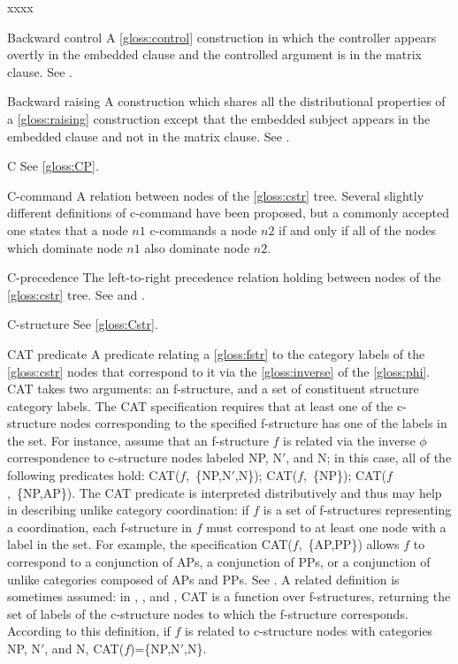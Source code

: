 \documentclass[output=paper,colorlinks,citecolor=brown]{langscibook}
\begin{document}
\begin{labeling}{xxxx}
\item[Backward control\namedlabel{gloss:backward}{backward}] A \ref{gloss:control} construction in which the controller appears overtly in the embedded clause and the controlled argument is in the matrix clause.  See .

\item[Backward raising] A construction which shares all the distributional properties of a \ref{gloss:raising} construction except that the embedded subject appears in the embedded clause and not in the matrix clause. See .

\item[C] See \ref{gloss:CP}.

\item[C-command\namedlabel{gloss:ccommand}{c-command}] A relation between nodes of the \ref{gloss:cstr} tree.  Several slightly different definitions of c-command have been proposed, but a commonly accepted one states that a node $n1$ c-commands a node $n2$ if and only if all of the nodes which dominate node $n1$ also dominate node $n2$.

\item[C-precedence\namedlabel{gloss:cprec}{c-precedence}] The left-to-right precedence relation holding between nodes of the \ref{gloss:cstr} tree.  See \citetv[\ref{sect:fprec}]{chapters/CoreConcepts} and \citetv[\ref{sec:Anaphora:2.3}]{chapters/Anaphora}.

\item[C-structure] See \ref{gloss:Cstr}.

\item[CAT predicate] A predicate relating a \ref{gloss:fstr} to the category labels of the \ref{gloss:cstr} nodes that correspond to it via the \ref{gloss:inverse} of the \ref{gloss:phi}.  CAT takes two arguments: an f-structure, and a set of constituent structure category labels. The CAT specification requires that at least one of the c-structure nodes corresponding to the specified f-structure has one of the labels in the set.  For instance, assume that an f-structure $f$ is related via the inverse $\phi$ correspondence to c-structure nodes labeled NP, N$'$, and N; in this case, all of the following predicates hold: CAT($f$,~\{NP,\;N$'$,\;N\}); CAT($f$,~\{NP\}); CAT($f$,~\{NP,\;AP\}). The CAT predicate is interpreted distributively and thus may help in describing unlike category coordination: if $f$ is a set of f-structures representing a coordination, each f-structure in $f$ must correspond to at least one node with a label in the set.  For example, the specification CAT($f$,~\{AP,\;PP\}) allows $f$ to correspond to a conjunction of APs, a conjunction of PPs, or a conjunction of unlike categories composed of APs and PPs. See .  A related definition is sometimes assumed: in , , and , CAT is a function over f-structures, returning the set of labels of the c-structure nodes to which the f-structure corresponds.  According to this definition, if $f$ is related to c-structure nodes with categories NP, N$'$, and N, CAT($f$)=\{NP,\;N$'$,\;N\}.   


\end{labeling}
\end{document}
